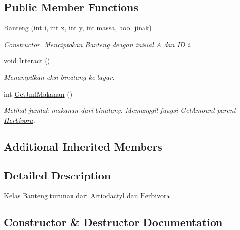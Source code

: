 \subsection*{Public Member Functions}
\begin{DoxyCompactItemize}
\item 
\hyperlink{classBanteng_a67115d9d4b6576dc53668118bcb63284}{Banteng} (int i, int x, int y, int massa, bool jinak)
\begin{DoxyCompactList}\small\item\em Constructor. Menciptakan \hyperlink{classBanteng}{Banteng} dengan inisial \textquotesingle{}A\textquotesingle{} dan ID i. \end{DoxyCompactList}\item 
void \hyperlink{classBanteng_a72cb2d24bcab61fa7c0319211b0d58cf}{Interact} ()\hypertarget{classBanteng_a72cb2d24bcab61fa7c0319211b0d58cf}{}\label{classBanteng_a72cb2d24bcab61fa7c0319211b0d58cf}

\begin{DoxyCompactList}\small\item\em Menampilkan aksi binatang ke layar. \end{DoxyCompactList}\item 
int \hyperlink{classBanteng_a302f2f5b3eaf114afedef16c9d5d129f}{Get\+Jml\+Makanan} ()
\begin{DoxyCompactList}\small\item\em Melihat jumlah makanan dari binatang. Memanggil fungsi Get\+Amount parent \hyperlink{classHerbivora}{Herbivora}. \end{DoxyCompactList}\end{DoxyCompactItemize}
\subsection*{Additional Inherited Members}


\subsection{Detailed Description}
Kelas \hyperlink{classBanteng}{Banteng} turunan dari \hyperlink{classArtiodactyl}{Artiodactyl} dan \hyperlink{classHerbivora}{Herbivora} 

\subsection{Constructor \& Destructor Documentation}
